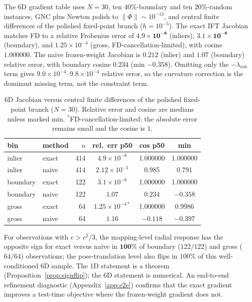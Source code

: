 The 6D gradient table uses $N=30$, ten $40\%$-boundary and ten $20\%$-random instances, GNC plus
Newton polish to $\|\Phi\|\sim10^{-13}$, and central finite differences of the polished fixed-point
branch ($h=10^{-5}$). The exact IFT Jacobian matches FD to a relative Frobenius error of
$\mathbf{4.9\times10^{-8}}$ (inliers), $\mathbf{3.1\times10^{-8}}$ (boundary), and
$1.25\times10^{-4}$ (gross, FD-cancellation-limited), with cosine $1.000000$. The naive
frozen-weight Jacobian is $0.212$ (inlier) and $\mathbf{1.07}$ (boundary) relative error, with
boundary cosine $0.234$ (min $-0.358$). Omitting only the $-\lambda_{\mathrm{rob}}$ term gives
$9.0\times10^{-4}$--$9.8\times10^{-4}$ relative error, so the curvature correction is the dominant
missing term, not the constraint term.

\begin{table}[t]
\caption{6D Jacobian versus central finite differences of the polished fixed-point branch
($N=30$). Relative error and cosine are medians unless marked min. $^\ast$FD-cancellation-limited;
the absolute error remains small and the cosine is $1$.}
\label{tab:gradient}
\centering
\footnotesize
\setlength{\tabcolsep}{3pt}
\begin{tabular}{llrccc}
\toprule
bin & method & $n$ & rel.\ err p50 & cos p50 & min \\
\midrule
inlier   & exact & 414 & $4.9\times10^{-8}$ & 1.000000 & 1.000000 \\
inlier   & naive & 414 & $2.12\times10^{-1}$ & 0.985 & 0.791 \\
boundary & exact & 122 & $3.1\times10^{-8}$ & 1.000000 & 1.000000 \\
boundary & naive & 122 & $\mathbf{1.07}$ & $\mathbf{0.234}$ & $\mathbf{-0.358}$ \\
gross    & exact & 64  & $1.25\times10^{-4\ast}$ & 1.000000 & 0.9986 \\
gross    & naive & 64  & $1.16$ & $-0.118$ & $-0.397$ \\
\bottomrule
\end{tabular}
\end{table}

For observations with $e>c^2/3$, the mapping-level radial response has the opposite sign for exact
versus naive in $\mathbf{100\%}$ of boundary ($122/122$) and gross ($64/64$) observations; the
pose-translation level also flips in $100\%$ of this well-conditioned 6D sample. The 1D statement is
a theorem (Proposition~\ref{prop:signflip}); the 6D statement is numerical. An end-to-end refinement
diagnostic (Appendix~\ref{app:e2e}) confirms that the exact gradient improves a test-time objective
where the frozen-weight gradient does not.

